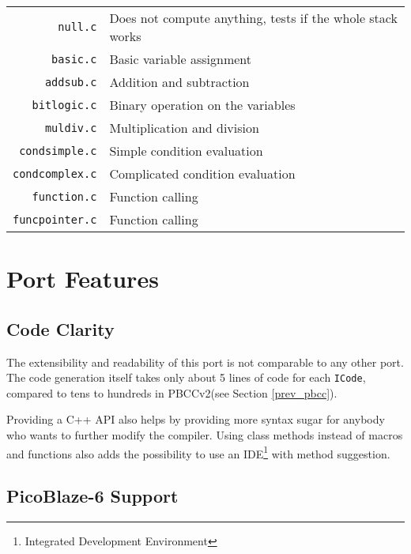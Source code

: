             \begin{center}
            \begin{tabular}{ r | l }
                \texttt{null.c} & Does not compute anything, tests if the whole stack works \\
                \texttt{basic.c} & Basic variable assignment \\
                \texttt{addsub.c} & Addition and subtraction \\
                \texttt{bitlogic.c} & Binary operation on the variables \\
                \texttt{muldiv.c} & Multiplication and division \\
                \texttt{condsimple.c} & Simple condition evaluation \\
                \texttt{condcomplex.c} & Complicated condition evaluation \\
                \texttt{function.c} & Function calling \\
                \texttt{funcpointer.c} & Function calling \\
            \end{tabular}
            \end{center}

\chapter{Port Features}\label{features}

    \section{Code Clarity}

    The extensibility and readability of this port is not comparable to any other port. The code generation itself takes only about 5 lines of code for each \texttt{ICode}, compared to tens to hundreds in PBCCv2(see Section \ref{prev_pbcc}).

    Providing a C++ API also helps by providing more syntax sugar for anybody who wants to further modify the compiler. Using class methods instead of macros and functions also adds the possibility to use an IDE\footnote{Integrated Development Environment} with method suggestion.

    \section{PicoBlaze-6 Support}

